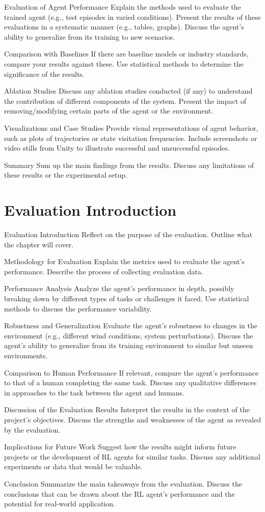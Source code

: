 Evaluation of Agent Performance
Explain the methods used to evaluate the trained agent (e.g., test episodes in varied conditions).
Present the results of these evaluations in a systematic manner (e.g., tables, graphs).
Discuss the agent’s ability to generalize from its training to new scenarios.

Comparison with Baselines
If there are baseline models or industry standards, compare your results against these.
Use statistical methods to determine the significance of the results.

Ablation Studies
Discuss any ablation studies conducted (if any) to understand the contribution of different components of the system.
Present the impact of removing/modifying certain parts of the agent or the environment.

Visualizations and Case Studies
Provide visual representations of agent behavior, such as plots of trajectories or state visitation frequencies.
Include screenshots or video stills from Unity to illustrate successful and unsuccessful episodes.

Summary
Sum up the main findings from the results.
Discuss any limitations of these results or the experimental setup.


\section{Evaluation Introduction}
Evaluation
Introduction
Reflect on the purpose of the evaluation.
Outline what the chapter will cover.

Methodology for Evaluation
Explain the metrics used to evaluate the agent’s performance.
Describe the process of collecting evaluation data.

Performance Analysis
Analyze the agent’s performance in depth, possibly breaking down by different types of tasks or challenges it faced.
Use statistical methods to discuss the performance variability.

Robustness and Generalization
Evaluate the agent's robustness to changes in the environment (e.g., different wind conditions, system perturbations).
Discuss the agent's ability to generalize from its training environment to similar but unseen environments.

Comparison to Human Performance
If relevant, compare the agent’s performance to that of a human completing the same task.
Discuss any qualitative differences in approaches to the task between the agent and humans.

Discussion of the Evaluation Results
Interpret the results in the context of the project's objectives.
Discuss the strengths and weaknesses of the agent as revealed by the evaluation.

Implications for Future Work
Suggest how the results might inform future projects or the development of RL agents for similar tasks.
Discuss any additional experiments or data that would be valuable.

Conclusion
Summarize the main takeaways from the evaluation.
Discuss the conclusions that can be drawn about the RL agent's performance and the potential for real-world application.